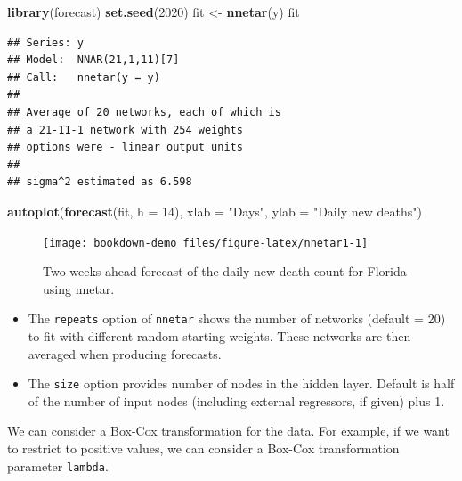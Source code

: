 \documentclass[]{book}
\newenvironment{Shaded}{\begin{snugshade}}{\end{snugshade}}
\newcommand{\KeywordTok}[1]{\textcolor[rgb]{0.13,0.29,0.53}{\textbf{#1}}}
\newcommand{\DataTypeTok}[1]{\textcolor[rgb]{0.13,0.29,0.53}{#1}}
\newcommand{\DecValTok}[1]{\textcolor[rgb]{0.00,0.00,0.81}{#1}}
\newcommand{\StringTok}[1]{\textcolor[rgb]{0.31,0.60,0.02}{#1}}
\newcommand{\NormalTok}[1]{#1}
\begin{document}
\begin{Shaded}
\begin{Highlighting}[]
\KeywordTok{library}\NormalTok{(forecast)}
\KeywordTok{set.seed}\NormalTok{(}\DecValTok{2020}\NormalTok{)}
\NormalTok{fit <-}\StringTok{ }\KeywordTok{nnetar}\NormalTok{(y)}
\NormalTok{fit}
\end{Highlighting}
\end{Shaded}

\begin{verbatim}
## Series: y 
## Model:  NNAR(21,1,11)[7] 
## Call:   nnetar(y = y)
## 
## Average of 20 networks, each of which is
## a 21-11-1 network with 254 weights
## options were - linear output units 
## 
## sigma^2 estimated as 6.598
\end{verbatim}

\begin{Shaded}
\begin{Highlighting}[]
\KeywordTok{autoplot}\NormalTok{(}\KeywordTok{forecast}\NormalTok{(fit, }\DataTypeTok{h =} \DecValTok{14}\NormalTok{), }\DataTypeTok{xlab =} \StringTok{"Days"}\NormalTok{, }
         \DataTypeTok{ylab =} \StringTok{"Daily new deaths"}\NormalTok{)}
\end{Highlighting}
\end{Shaded}

\begin{figure}

{\centering \texttt{[image: bookdown-demo\_files/figure-latex/nnetar1-1]} 

}

\caption{Two weeks ahead forecast of the daily new death count for Florida using nnetar.}\label{fig:nnetar1}
\end{figure}

\begin{itemize}
\item
  The \texttt{repeats} option of \texttt{nnetar} shows the number of
  networks (default = 20) to fit with different random starting weights.
  These networks are then averaged when producing forecasts.
\item
  The \texttt{size} option provides number of nodes in the hidden layer.
  Default is half of the number of input nodes (including external
  regressors, if given) plus 1.
\end{itemize}

We can consider a Box-Cox transformation for the data. For example, if
we want to restrict to positive values, we can consider a Box-Cox
transformation parameter \texttt{lambda}.
\end{document}

